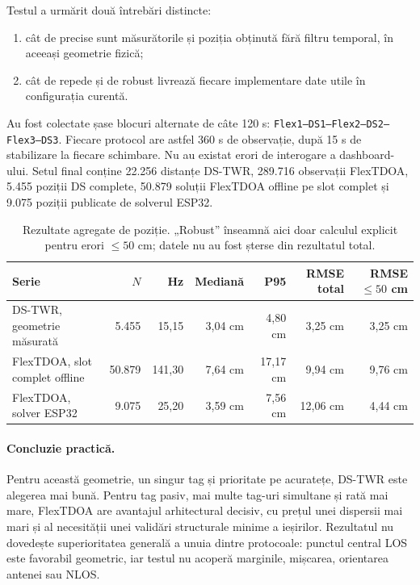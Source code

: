 \documentclass[11pt,a4paper]{article}
\begin{document}
Testul a urmărit două întrebări distincte:

\begin{enumerate}[leftmargin=7mm]
  \item cât de precise sunt măsurătorile și poziția obținută fără filtru
  temporal, în aceeași geometrie fizică;
  \item cât de repede și de robust livrează fiecare implementare date utile în
  configurația curentă.
\end{enumerate}

Au fost colectate șase blocuri alternate de câte 120 s:
\texttt{Flex1--DS1--Flex2--DS2--Flex3--DS3}. Fiecare protocol are astfel 360 s
de observație, după 15 s de stabilizare la fiecare schimbare. Nu au existat
erori de interogare a dashboard-ului. Setul final conține 22.256 distanțe
DS-TWR, 289.716 observații FlexTDOA, 5.455 poziții DS complete, 50.879 soluții
FlexTDOA offline pe slot complet și 9.075 poziții publicate de solverul ESP32.

\begin{table}[H]
  \centering
  \caption{Rezultate agregate de poziție. „Robust” înseamnă aici doar calculul
  explicit pentru erori $\leq 50$ cm; datele nu au fost șterse din rezultatul
  total.}
  \small
  \begin{tabularx}{\textwidth}{lrrrrrr}
    \toprule
    Serie & $N$ & Hz & Mediană & P95 & RMSE total & RMSE $\leq50$ cm\\
    \midrule
    DS-TWR, geometrie măsurată
      & 5.455 & 15,15 & 3,04 cm & 4,80 cm & 3,25 cm & 3,25 cm\\
    FlexTDOA, slot complet offline
      & 50.879 & 141,30 & 7,64 cm & 17,17 cm & 9,94 cm & 9,76 cm\\
    FlexTDOA, solver ESP32
      & 9.075 & 25,20 & 3,59 cm & 7,56 cm & 12,06 cm & 4,44 cm\\
    \bottomrule
  \end{tabularx}
\end{table}

\paragraph{Concluzie practică.}
Pentru această geometrie, un singur tag și prioritate pe acuratețe, DS-TWR este
alegerea mai bună. Pentru tag pasiv, mai multe tag-uri simultane și rată mai
mare, FlexTDOA are avantajul arhitectural decisiv, cu prețul unei dispersii mai
mari și al necesității unei validări structurale minime a ieșirilor. Rezultatul
nu dovedește superioritatea generală a unuia dintre protocoale: punctul central
LOS este favorabil geometric, iar testul nu acoperă marginile, mișcarea,
orientarea antenei sau NLOS.
\end{document}
